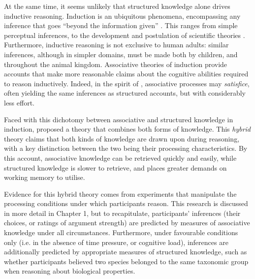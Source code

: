 At the same time, it seems unlikely that 
structured knowledge alone drives inductive reasoning.
Induction is an ubiquitous phenomena, encompassing any inference that goes
``beyond the information given'' \citep{Bruner1973}.
This ranges from simple perceptual inferences,
to the development and postulation of scientific theories
\citep[see][for a taxonomy of inductive inferences]{Kemp2014}.
Furthermore, inductive reasoning is not exclusive to human adults:
similar inferences, although in simpler domains,
must be made both by children, and throughout the animal kingdom.
Associative theories of induction provide accounts that
make more reasonable claims about the cognitive abilities
required to reason inductively.
Indeed, in the spirit of \citet{Simon1956},
associative processes may \emph{satisfice},
often yielding the same inferences as structured accounts,
but with considerably less effort.

Faced with this dichotomy between associative and structured knowledge in induction,
\citet{Bright2014a} proposed a theory that combines both forms of knowledge.
This \emph{hybrid} theory claims
that both kinds of knowledge are drawn upon during reasoning,
with a key distinction between the two being their processing characteristics.
By this account, associative knowledge can be retrieved quickly and easily,
while structured knowledge is slower to retrieve,
and places greater demands on working memory to utilise.

Evidence for this hybrid theory
comes from experiments that manipulate 
the processing conditions under which participants reason.
This research is discussed in more detail in Chapter 1, but to recapitulate,
participants' inferences (their choices, or ratings of argument strength)
are predicted by measures of associative knowledge under all circumstances.
Furthermore, under favourable conditions only
(i.e. in the absence of time pressure, or cognitive load),
inferences are additionally predicted by
appropriate measures of structured knowledge,
such as whether participants believed two species
belonged to the same taxonomic group
when reasoning about biological properties.

